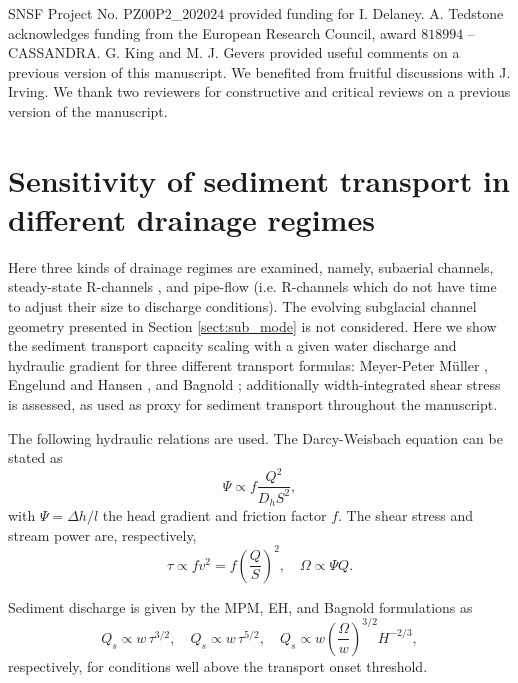 \documentclass[esurf, manuscript]{copernicus}
\begin{document}

\begin{acknowledgements}
  SNSF Project No. $\mathrm{PZ00P2}$\_$202024$ provided  funding for I. Delaney.
  A. Tedstone acknowledges funding from the European Research Council, award $818994$ -- CASSANDRA.
  G. King and M. J. Gevers provided useful comments on a previous version of this manuscript.
  We benefited from fruitful discussions with J. Irving.
  We thank two reviewers for constructive and critical reviews on a previous version of the manuscript.
\end{acknowledgements}
\newpage
\appendix
\section{Sensitivity of sediment transport in different drainage regimes}
\label{sect:scaling}

Here three kinds of drainage regimes are examined, namely, subaerial channels, steady-state R-channels \citep{rothlisberger1972}, and pipe-flow (i.e. R-channels which do not have time to adjust their size to discharge conditions).
The evolving subglacial channel geometry presented in Section \ref{sect:sub_mode} is not considered.
Here we show the sediment transport capacity scaling with a given water discharge and hydraulic gradient for three different transport formulas: Meyer-Peter M\"uller  \citep[MPM; ][]{meyer1948}, Engelund and Hansen \citep[EH; ][]{engelund1967}, and Bagnold \citep{bagnold1980}; additionally width-integrated shear stress is assessed, as used as proxy for sediment transport throughout the manuscript.

The following hydraulic relations are used.
The Darcy-Weisbach equation can be stated as
\begin{equation}
  \label{eq:DW}
  \Psi \propto f\frac{Q^2}{D_h S^2},
\end{equation}
with $\Psi = \Delta h / l$ the head gradient and friction factor $f$.
The shear stress and stream power are, respectively,
\begin{equation}
  \label{eq:tau-omega}
  \tau \propto f v^2 = f \left(\frac{Q}{S}\right)^2, \quad  \Omega \propto \Psi Q.
\end{equation}
% 

Sediment discharge is given by the MPM, EH, and Bagnold formulations as
\begin{equation}
  Q_s \propto w\, \tau^{3/2}, \quad Q_s \propto w\, \tau^{5/2}, \quad Q_s \propto w \left(\frac{\Omega}{w}\right)^{3/2} H^{-2/3},
\end{equation}
respectively, for conditions well above the transport onset threshold.
\end{document}
